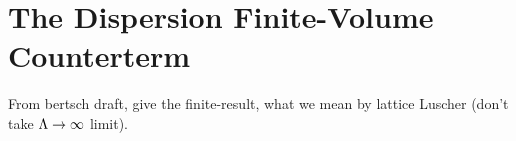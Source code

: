 \section{The Dispersion \Luscher Finite-Volume Counterterm}\label{sec:counterterm/dispersion}

From bertsch draft, give the finite-\nstep result, what we mean by lattice Luscher (don't take $\Lambda\rightarrow\infty$ limit).
